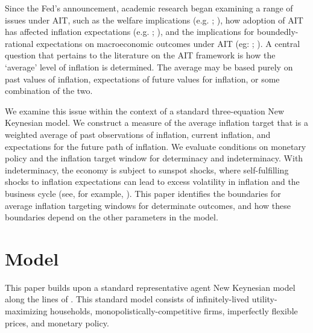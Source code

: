 \documentclass[english,authoryear,12pt]{elsarticle}
\begin{document}
Since the Fed's announcement, academic research began examining a range of issues under AIT, such as the welfare implications (e.g. \citealp{budianto2020}; \citealp{eo2020}), how adoption of AIT has affected inflation expectations (e.g. \citealp{coibion2020}; \citealp{hoffmann2022}), and the implications for boundedly-rational expectations on macroeconomic outcomes under AIT (eg: \citealp{honka2021}; \citealp{budianto2020}). A central question that pertains to the literature on the AIT framework is how the `average' level of inflation is determined. The average may be based purely on past values of inflation, expectations of future values for inflation, or some combination of the two.

We examine this issue within the context of a standard three-equation New Keynesian model. We construct a measure of the average inflation target that is a weighted average of past observations of inflation, current inflation, and expectations for the future path of inflation. We evaluate conditions on monetary policy and the inflation target window for determinacy and indeterminacy. With indeterminacy, the economy is subject to sunspot shocks, where self-fulfilling shocks to inflation expectations can lead to excess volatility in inflation and the business cycle (see, for example, \citealp{lubik2004}). This paper identifies the boundaries for average inflation targeting windows for determinate outcomes, and how these boundaries depend on the other parameters in the model.


\section{\label{Model}Model}
This paper builds upon a standard representative agent New Keynesian model along the lines of \cite{clarida1999}. This standard model consists of infinitely-lived utility-maximizing households, monopolistically-competitive firms, imperfectly flexible prices, and monetary policy.
\end{document}
